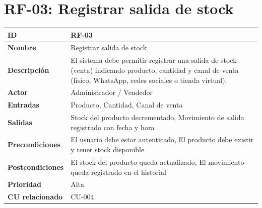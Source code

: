 \documentclass{article}
\begin{document}
\section*{RF-03: Registrar salida de stock}
\begin{center}
\renewcommand{\arraystretch}{1.4}
\begin{tabular}{|L{4cm}|L{12cm}|}
\hline
\textbf{ID} & RF-03 \\
\hline
\textbf{Nombre} & Registrar salida de stock \\
\hline
\textbf{Descripción} & El sistema debe permitir registrar una salida de stock (venta) indicando producto, cantidad y canal de venta (físico, WhatsApp, redes sociales o tienda virtual). \\
\hline
\textbf{Actor} & Administrador / Vendedor \\
\hline
\textbf{Entradas} & Producto, Cantidad, Canal de venta \\
\hline
\textbf{Salidas} & Stock del producto decrementado, Movimiento de salida registrado con fecha y hora \\
\hline
\textbf{Precondiciones} & El usuario debe estar autenticado, El producto debe existir y tener stock disponible \\
\hline
\textbf{Postcondiciones} & El stock del producto queda actualizado, El movimiento queda registrado en el historial \\
\hline
\textbf{Prioridad} & Alta \\
\hline
\textbf{CU relacionado} & CU-004 \\
\hline
\end{tabular}
\end{center}
\end{document}
